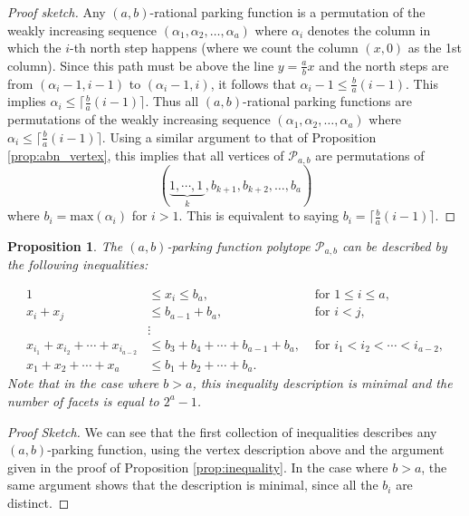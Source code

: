 \documentclass[11pt]{amsart}
\newtheorem{proposition}[theorem]{Proposition}
\theoremstyle{definition}
\newcommand{\0}{\emptyset}
\begin{document}
\begin{proof} [Proof sketch]
   Any $(a,b)$-rational parking function is a permutation of the weakly increasing sequence $(\alpha_1, \alpha_2,\dots, \alpha_a)$ where $\alpha_i$ denotes the column in which the $i$-th north step happens (where we count the column $(x,0)$ as the 1st column). 
   Since this path must be above the line $y=\frac{a}{b}x$ and the north steps are from $(\alpha_i -1, i-1)$ to $ (\alpha_i -1, i)$, it follows that $\alpha_i  -1 \leq  \frac{b}{a}(i-1)$. 
   This implies $\alpha_i \leq \lceil \frac{b}{a}(i-1) \rceil$.
Thus all $(a,b)$-rational parking functions are permutations of the weakly increasing sequence   $(\alpha_1, \alpha_2,\dots, \alpha_a)$ where $\alpha_i \leq \lceil \frac{b}{a}(i-1) \rceil$.
Using a similar argument to that of Proposition \ref{prop:abn_vertex}, this implies that all vertices of $\mathcal{P}_{a,b}$ are permutations of 
$$(\underbrace{1,\cdots, 1\,}_k, b_{k+1}, b_{k+2}, \dots, b_a)$$
where $b_i = \text{max}(\alpha_i)$ for $i>1$. 
This is equivalent to saying $b_i =  \lceil \frac{b}{a}(i-1) \rceil$. 
\end{proof}


\begin{proposition}\label{prop:rational_hyperplane}
The $(a,b)$-parking function polytope $\mathcal{P}_{a,b}$ can be described by the following  inequalities:

\begin{align*}
    1&\leq x_i\leq b_a, &\text{ for } 1\leq i \leq a,\\
    x_i+x_j &\leq b_{a-1} + b_a, &\text{ for } i<j,\\
    &\vdots \\ 
    x_{i_1} + x_{i_2} + \cdots + x_{i_{a-2}} &\leq b_3 + b_4 +\cdots + b_{a-1}+  b_a, &\text{ for }  i_1 < i_2 < \cdots < i_{a-2}, \\ 
    x_1+x_2+\cdots + x_a &\leq b_1 + b_2 + \cdots + b_{a}.
\end{align*}
Note that in the case where $b>a$, this inequality description is minimal and the number of facets is equal to $2^a -1$. 
  
\end{proposition}
\begin{proof}[Proof Sketch]
    We can see that the first collection of inequalities describes any $(a,b)$-parking function, using the vertex description above and the argument given in the proof of Proposition \ref{prop:inequality}. 
    In the case where $b>a$, the same argument shows that the description is minimal, since all the $b_i$ are distinct. 
\end{proof}
\end{document}
